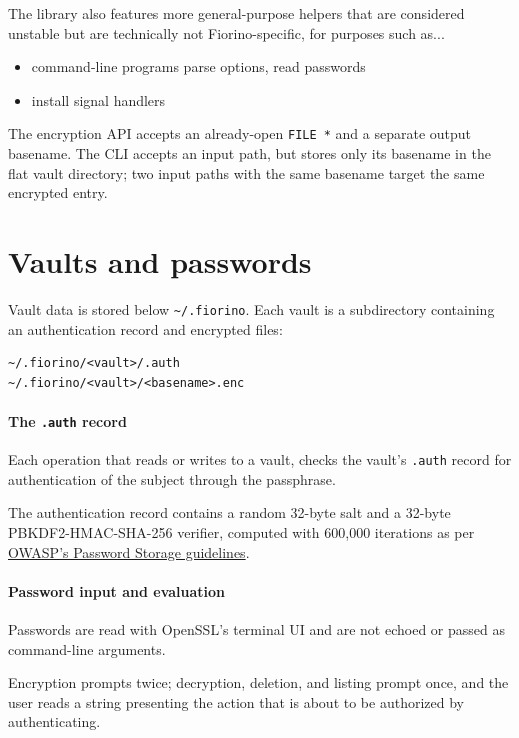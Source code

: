 The library also features more general-purpose helpers that are considered unstable
but are technically not Fiorino-specific, for purposes such as...

\begin{itemize}
    \item command-line programs parse options, read passwords
    \item install signal handlers
\end{itemize}

The encryption API accepts an already-open \texttt{FILE *} and a separate
output basename. The CLI accepts an input path, but stores only its basename
in the flat vault directory; two input paths with the same basename target the
same encrypted entry.

\section{Vaults and passwords}

Vault data is stored below \texttt{\textasciitilde/.fiorino}. Each vault is a
subdirectory containing an authentication record and encrypted files:

\begin{verbatim}
~/.fiorino/<vault>/.auth
~/.fiorino/<vault>/<basename>.enc
\end{verbatim}

\paragraph{The \texttt{.auth} record}
Each operation that reads or writes to a vault, checks the vault's \texttt{.auth}
record for authentication of the subject through the passphrase.

The authentication record contains a random 32-byte salt
and a 32-byte PBKDF2-HMAC-SHA-256 verifier, computed with 600,000 iterations
as per \href{https://cheatsheetseries.owasp.org/cheatsheets/Password_Storage_Cheat_Sheet.html}
{OWASP's Password Storage guidelines}.

\paragraph{Password input and evaluation}
Passwords are read with OpenSSL's terminal UI and are not echoed or passed as
command-line arguments.

Encryption prompts twice; decryption, deletion, and
listing prompt once, and the user reads a string presenting the action that
is about to be authorized by authenticating.


